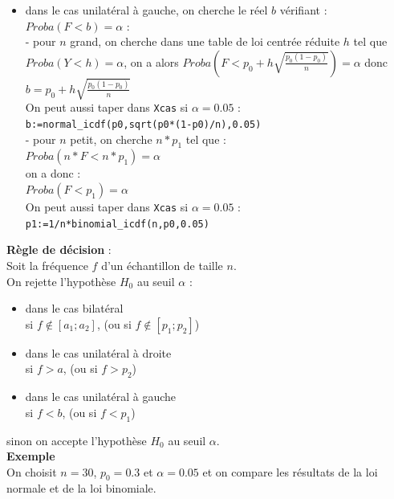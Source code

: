 \documentclass[a4paper,11pt]{book}
\begin{document}
\begin{itemize}
\item  dans le cas unilat\'eral \`a gauche, on cherche le r\'eel 
$b$ v\'erifiant :\\
$Proba(F<b)=\alpha$ :\\
- pour $n$ grand, on cherche dans une table de loi centr\'ee r\'eduite $h$ tel 
que $Proba(Y<h)=\alpha$, on a alors $Proba( F<p_0+h\sqrt{\frac{p_0(1-p_0)}{n}})=\alpha$ donc\\
 $b=p_0+h\sqrt{\frac{p_0(1-p_0)}{n}}$ \\ 
On peut aussi taper dans {\tt Xcas}  si $\alpha=0.05$ :\\
{\tt b:=normal\_icdf(p0,sqrt(p0*(1-p0)/n),0.05)}\\
- pour $n$ petit, on cherche $n*p_1$ tel que :\\
$Proba(n*F< n*p_1)=\alpha$\\
on a donc :\\
$Proba(F<p_1)=\alpha$\\
On peut aussi taper dans {\tt Xcas}  si $\alpha=0.05$ :\\
{\tt p1:=1/n*binomial\_icdf(n,p0,0.05)}
\end{itemize}
{\bf R\`egle de d\'ecision} :\\
Soit la fr\'equence $f$ d'un \'echantillon de taille $n$.\\
On rejette l'hypoth\`ese $H_0$ au seuil $\alpha$ :
\begin{itemize}
\item dans le cas bilat\'eral\\ 
si $f\not\in [a_1;a_2]$, (ou si $f\not\in [p_1;p_2]$) 
\item dans le cas unilat\'eral \`a droite\\
si $f>a$, (ou si $f>p_2$)
\item dans le cas unilat\'eral \`a gauche\\
si $f<b$, (ou si $f<p_1$)
\end{itemize}
sinon on accepte l'hypoth\`ese $H_0$ au seuil $\alpha$.\\
{\bf Exemple}\\
On choisit $n=30$, $p_0=0.3$ et $\alpha=0.05$ et on compare les r\'esultats de 
la loi normale et de la loi binomiale.\\
\end{document}
